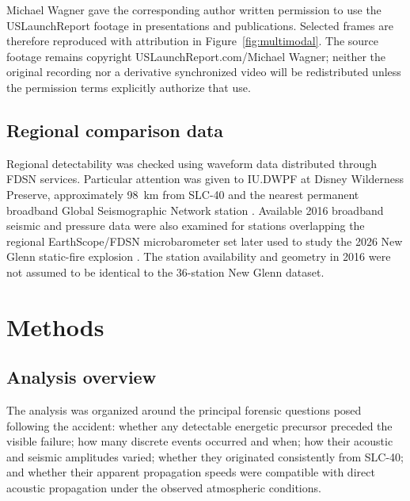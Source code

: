 \documentclass[]{seismica}
\begin{document}
Michael Wagner gave the corresponding author written permission to use the
USLaunchReport footage in presentations and publications. Selected frames are
therefore reproduced with attribution in Figure~\ref{fig:multimodal}. The
source footage remains copyright USLaunchReport.com/Michael Wagner; neither
the original recording nor a derivative synchronized video will be
redistributed unless the permission terms explicitly authorize that use.

\subsection{Regional comparison data}

Regional detectability was checked using waveform data distributed through
FDSN services. Particular attention was given to IU.DWPF at Disney Wilderness
Preserve, approximately 98~km from SLC-40 and the nearest permanent broadband
Global Seismographic Network station \citep{asl_gsn_iu_1988}. Available 2016
broadband seismic and pressure data were also examined for stations overlapping
the regional EarthScope/FDSN microbarometer set later used to study the 2026
New Glenn static-fire explosion \citep{silber_scamfer_newglenn_2026}. The
station availability and geometry in 2016 were not assumed to be identical to
the 36-station New Glenn dataset.


\section{Methods}
\label{sec:methods}

\subsection{Analysis overview}

The analysis was organized around the principal forensic questions posed
following the accident: whether any detectable energetic precursor preceded
the visible failure; how many discrete events occurred and when; how their
acoustic and seismic amplitudes varied; whether they originated consistently
from SLC-40; and whether their apparent propagation speeds were compatible with
direct acoustic propagation under the observed atmospheric conditions.
\end{document}
